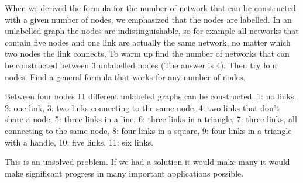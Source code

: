 


When we derived the formula for the number of network that can be constructed with a given number of nodes, we emphasized that the nodes are labelled. In an unlabelled graph the nodes are indistinguishable, so for example all networks that contain five nodes and  one link are actually the same network, no matter which two nodes the link connects, To warm up find the number of networks that can be constructed between 3 unlabelled nodes (The answer is 4). Then try four nodes. Find a general formula that works for any number of nodes. 


\solution
Between four nodes 11 different unlabeled graphs can be constructed. 1: no links, 2: one link, 3: two links connecting to the same node, 4: two links that don't share a node, 5: three links in a line, 6: three links in a triangle, 7: three links, all connecting to the same node, 8: four links in a square, 9: four links in a triangle with a handle, 10: five links, 11: six links.

This is an unsolved problem. If we had a solution it would make many it would make significant progress in many important applications possible.

\solutionend